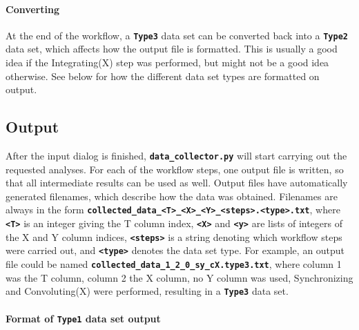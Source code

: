 \documentclass[a4paper,10pt,DIV=15,openany]{scrbook}
\newcommand{\ttt}[1]{\textbf{\texttt{#1}}}
\begin{document}
\paragraph{Converting}

At the end of the workflow, a \ttt{Type3} data set can be converted back into a \ttt{Type2} data set, which affects how the output file is formatted.
This is usually a good idea if the Integrating(X) step was performed, but might not be a good idea otherwise.
See below for how the different data set types are formatted on output.

\subsection{Output}

After the input dialog is finished, \ttt{data\_collector.py} will start carrying out the requested analyses.
For each of the workflow steps, one output file is written, so that all intermediate results can be used as well.
Output files have automatically generated filenames, which describe how the data was obtained.
Filenames are always in the form \ttt{collected\_data\_<T>\_<X>\_<Y>\_<steps>.<type>.txt}, where \ttt{<T>} is an integer giving the T column index, \ttt{<X>} and \ttt{<y>} are lists of integers of the X and Y column indices, \ttt{<steps>} is a string denoting which workflow steps were carried out, and \ttt{<type>} denotes the data set type.
For example, an output file could be named \ttt{collected\_data\_1\_2\_0\_sy\_cX.type3.txt}, where column 1 was the T column, column 2 the X column, no Y column was used, Synchronizing and Convoluting(X) were performed, resulting in a \ttt{Type3} data set.

\paragraph{Format of \ttt{Type1} data set output}
\end{document}
